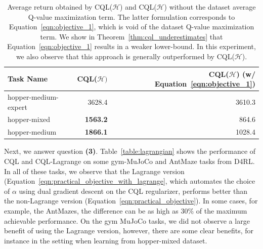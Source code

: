 \begin{table}[h]
    \centering
    \begin{tabular}{l|r|r}
    \hline
        \textbf{Task Name} & \textbf{CQL($\mathcal{H})$} & \textbf{CQL($\mathcal{H}$) (w/ Equation~\ref{eqn:objective_1})} \\
        \hline
        hopper-medium-expert & 3628.4 & 3610.3 \\
        hopper-mixed & \textbf{1563.2} & 864.6 \\
        hopper-medium & \textbf{1866.1} & 1028.4 \\
        \hline
    \end{tabular}
    \caption{{\small Average return obtained by CQL($\mathcal{H}$) and CQL($\mathcal{H}$) without the dataset average Q-value maximization term. The latter formulation corresponds to Equation~\ref{eqn:objective_1}, which is void of the dataset Q-value maximization term. We show in Theorem~\ref{thm:cql_underestimates} that Equation~\ref{eqn:objective_1} results in a weaker lower-bound. In this experiment, we also observe that this approach is generally outperformed by CQL($\mathcal{H}$).}}
    \vspace{-15pt}
    \label{table:data_subtract}
\end{table}

Next, we answer question \textbf{(3)}. Table~\ref{table:lagrangian} shows the performance of CQL and CQL-Lagrange on some gym-MuJoCo and AntMaze tasks from D4RL. In all of these tasks, we observe that the Lagrange version (Equation~\ref{eqn:practical_objective_with_lagrange}, which automates the choice of $\alpha$ using dual gradient descent on the CQL regularizer, performs better than the non-Lagrange version (Equation~\ref{eqn:practical_objective}). In some cases, for example, the AntMazes, the difference can be as high as 30\% of the maximum achievable performance. On the gym MuJoCo tasks, we did not observe a large benefit of using the Lagrange version, however, there are some clear benefits, for instance in the setting when learning from hopper-mixed dataset.

